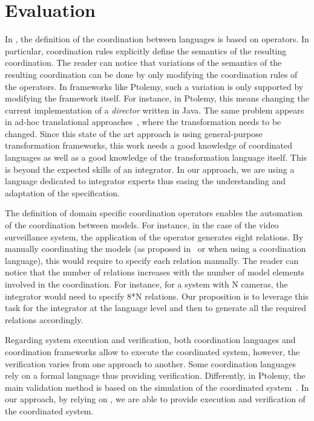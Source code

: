 \section{Evaluation}
\label{sec:evaluation}
In \bcool, the definition of the coordination between languages is based on operators. In particular, coordination rules explicitly define the semantics of the resulting coordination. The reader can notice that variations of the semantics of the resulting coordination can be done by only modifying the coordination rules of the operators. In frameworks like Ptolemy, such a variation is only supported by modifying the framework itself. For instance, in Ptolemy, this means changing the current implementation of a \emph{director} written in Java. The same problem appears in ad-hoc translational approaches~\cite{dinatale}, where the transformation needs to be changed. Since this state of the art approach is using general-purpose transformation frameworks, this work needs a good knowledge of coordinated languages as well as a good knowledge of the transformation language itself. This is beyond the expected skills of an integrator. In our approach, we are using a language dedicated to integrator experts thus easing the understanding and adaptation of the \bcool specification. 

The definition of domain specific coordination operators enables the automation of the coordination between models. For instance, in the case of the video surveillance system, the application of the operator generates eight \ccsl relations. By manually coordinating the models (as proposed in~\cite{varalarsen:gemoc13} or when using a coordination language), this would require to specify each relation manually. The reader can notice that the number of relations increases with the number of model elements involved in the coordination. For instance, for a system with N cameras, the integrator would need to specify 8*N relations. Our proposition is to leverage this task for the integrator at the language level and then to generate all the required relations accordingly.

Regarding system execution and verification, both coordination languages and coordination frameworks allow to execute the coordinated system, however, the verification varies from one approach to another. Some coordination languages rely on a formal language thus providing verification. Differently, in Ptolemy, the main validation method is based on the simulation of the coordinated system~\cite{girault_lee:composition}. In our approach, by relying on \ccsl, we are able to provide execution and verification of the coordinated system.

